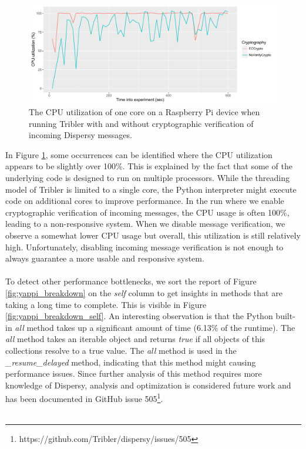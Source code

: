 \begin{figure}[!h]
	\centering
	\includegraphics[width=1.0\columnwidth]{images/experiments/raspi_cpu_usage}
	\caption{The CPU utilization of one core on a Raspberry Pi device when running Tribler with and without cryptographic verification of incoming Dispersy messages.}
	\label{fig:raspi_cpu_usage}
\end{figure}

\noindent In Figure \ref{fig:raspi_cpu_usage}, some occurrences can be identified where the CPU utilization appears to be slightly over 100\%. This is explained by the fact that some of the underlying code is designed to run on multiple processors. While the threading model of Tribler is limited to a single core, the Python interpreter might execute code on additional cores to improve performance. In the run where we enable cryptographic verification of incoming messages, the CPU usage is often 100\%, leading to a non-responsive system. When we disable message verification, we observe a somewhat lower CPU usage but overall, this utilization is still relatively high. Unfortunately, disabling incoming message verification is not enough to always guarantee a more usable and responsive system.\\\\
To detect other performance bottlenecks, we sort the report of Figure \ref{fig:yappi_breakdown} on the \emph{self} column to get insights in methods that are taking a long time to complete. This is visible in Figure \ref{fig:yappi_breakdown_self}. An interesting observation is that the Python built-in \emph{all} method takes up a significant amount of time (6.13\% of the runtime). The \emph{all} method takes an iterable object and returns \emph{true} if all objects of this collections resolve to a true value. The \emph{all} method is used in the \emph{\_resume\_delayed} method, indicating that this method might causing performance issues. Since further analysis of this method requires more knowledge of Dispersy, analysis and optimization is considered future work and has been documented in GitHub issue 505\footnote{https://github.com/Tribler/dispersy/issues/505}.\\\\


